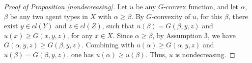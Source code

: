 \documentclass[a4paper, 11pt]{amsart}
\numberwithin{equation}{section}
\theoremstyle{plain}
\theoremstyle{definition}
\theoremstyle{remark}
\begin{document}
\vspace{0.3cm}

\begin{proof}[Proof of Proposition \ref{nondecreasing}]
	Let $u$ be any $G$-convex function, and let $\alpha$, $\beta$ be any two agent types in $X$ with $\alpha \ge \beta$. By $G$-convexity of $u$, for this $\beta$, there exist $y\in cl(Y)$ and $z \in cl(Z)$, such that $u(\beta)=G(\beta, y,z)$ and $u(x)\ge G(x, y,z)$, for any $x\in X$. Since $\alpha \ge \beta$, by Assumption 3, we have $G(\alpha, y,z)\ge G(\beta,y,z)$. Combining with $u(\alpha)\ge G(\alpha, y,z)$ and $u(\beta) = G(\beta,y,z)$, one has $u(\alpha) \ge u(\beta)$. Thus, $u$ is nondecreasing.
\end{proof}

\vspace{0.3cm}
\end{document}
